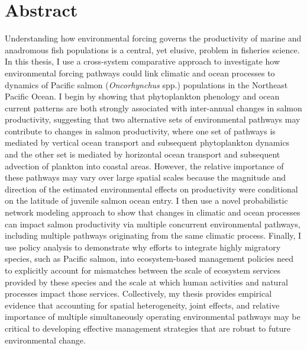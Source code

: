 %
%
%


\chapter*{Abstract}


Understanding how environmental forcing governs the productivity of marine and
anadromous fish populations is a central, yet elusive, problem in fisheries
science. In this thesis, I use a cross-system comparative approach to
investigate how environmental forcing pathways could link climatic and ocean
processes to dynamics of Pacific salmon (\textit{Oncorhynchus} spp.) populations
in the Northeast Pacific Ocean. I begin by showing that phytoplankton phenology
and ocean current patterns are both strongly associated with inter-annual
changes in salmon productivity, suggesting that two alternative sets of
environmental pathways may contribute to changes in salmon productivity, where
one set of pathways is mediated by vertical ocean transport and subsequent
phytoplankton dynamics and the other set is mediated by horizontal ocean
transport and subsequent advection of plankton into coastal areas. However, the
relative importance of these pathways may vary over large spatial scales because
the magnitude and direction of the estimated environmental effects on
productivity were conditional on the latitude of juvenile salmon ocean entry. I
then use a novel probabilistic network modeling approach to show that changes in
climatic and ocean processes can impact salmon productivity via multiple
concurrent environmental pathways, including multiple pathways originating from
the same climatic process. Finally, I use policy analysis to demonstrate why
efforts to integrate highly migratory species, such as Pacific salmon, into
ecosystem-based management policies need to explicitly account for mismatches
between the scale of ecosystem services provided by these species and the scale
at which human activities and natural processes impact those services.
Collectively, my thesis provides empirical evidence that accounting for spatial
heterogeneity, joint effects, and relative importance of multiple simultaneously
operating environmental pathways may be critical to developing effective
management strategies that are robust to future environmental change.
\newline


